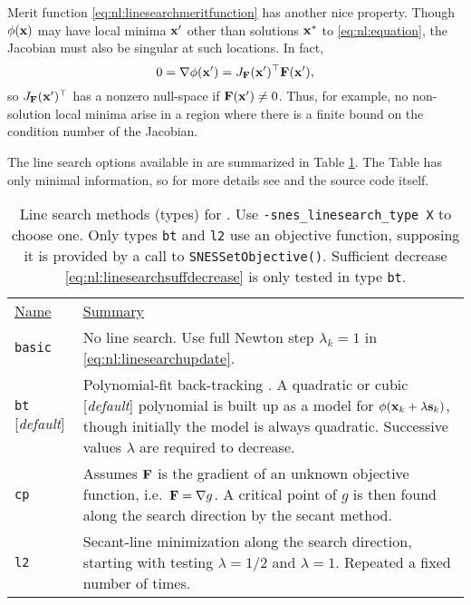 Merit function \eqref{eq:nl:linesearchmeritfunction} has another nice property.  Though $\phi(\mathbf{x})$ may have local minima $\mathbf{x}'$ other than solutions $\mathbf{x}^*$ to \eqref{eq:nl:equation}, the Jacobian must also be singular at such locations.  In fact,
\begin{equation}
0 = \nabla \phi (\mathbf{x}') = J_{\mathbf{F}}(\mathbf{x}')^\top \mathbf{F}(\mathbf{x}'),
\end{equation}
so $J_{\mathbf{F}}(\mathbf{x}')^\top$ has a nonzero null-space if $\mathbf{F}(\mathbf{x}')\ne 0$.  Thus, for example, no non-solution local minima arise in a region where there is a finite bound on the condition number of the Jacobian.

The line search options available in \PETSc are summarized in Table \ref{tab:nl:linesearchoptions}.  The Table has only minimal information, so for more details see \citep[Chapter 6]{DennisSchnabel1983} and the \PETSc source code itself.

\begin{table}
\begin{tabular}{ll}
\underline{Name} & \underline{Summary} \vspace{0.05in} \\ \vspace{0.1in}
\texttt{basic} & No line search.  Use full Newton step $\lambda_k=1$ in \eqref{eq:nl:linesearchupdate}. \\ \vspace{0.1in}
\texttt{bt} [\emph{default}] & \begin{minipage}[t]{0.8\textwidth}
Polynomial-fit back-tracking \citep[section 6.3.2]{DennisSchnabel1983}.  A quadratic or cubic [\emph{default}] polynomial is built up as a model for \mbox{$\phi(\mathbf{x}_k+\lambda \mathbf{s}_k)$}, though initially the model is always quadratic.  Successive values $\lambda$ are required to decrease.
\end{minipage} \\ \vspace{0.1in}
\texttt{cp} & \begin{minipage}[t]{0.83\textwidth}
Assumes $\mathbf{F}$ is the gradient of an unknown objective function, i.e.~\mbox{$\mathbf{F}=\nabla g$}.  A critical point of $g$ is then found along the search direction by the secant method.
\end{minipage} \\ \vspace{0.1in}
\texttt{l2} & \begin{minipage}[t]{0.83\textwidth}
Secant-line minimization along the search direction, starting with testing \mbox{$\lambda=1/2$} and \mbox{$\lambda=1$}. Repeated a fixed number of times.
\end{minipage}
\end{tabular}
\caption{Line search methods (types) for \pSNES.  Use \texttt{-snes\_linesearch\_type X} to choose one.  Only types \texttt{bt} and \texttt{l2} use an objective function, supposing it is provided by a call to \texttt{SNESSetObjective()}.  Sufficient decrease \eqref{eq:nl:linesearchsuffdecrease} is only tested in type \texttt{bt}.} \label{tab:nl:linesearchoptions}
\end{table}

